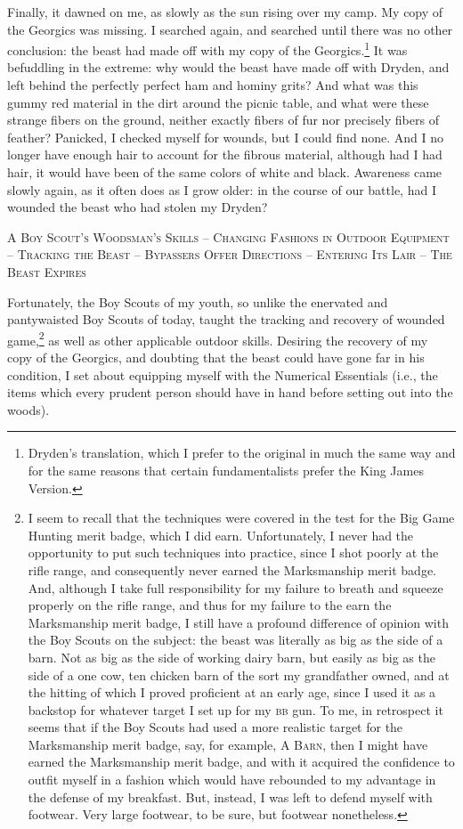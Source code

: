 \par
Finally, it dawned on me, as slowly as the sun rising over my camp.  My copy of the Georgics was missing.  I searched again, and searched until there was no other conclusion: the beast had made off with my copy of the Georgics.\footnote{Dryden's translation, which I prefer to the original in much the same way and for the same reasons that certain fundamentalists prefer the King James Version.}  It was befuddling in the extreme: why would the beast have made off with Dryden, and left behind the perfectly perfect ham and hominy grits?  And what was this gummy red material in the dirt around the picnic table, and what were these strange fibers on the ground, neither exactly fibers of fur nor precisely fibers of feather?  Panicked, I checked myself for wounds, but I could find none.  And I no longer have enough hair to account for the fibrous material, although had I had hair, it would have been of the same colors of white and black.  Awareness came slowly again, as it often does as I grow older: in the course of our battle, had I wounded the beast who had stolen my Dryden?
\par
\begin{center}
\textsc{A Boy Scout's Woodsman's Skills – Changing Fashions in Outdoor Equipment – Tracking the Beast – Bypassers Offer Directions – Entering Its Lair – The Beast Expires}
\end{center}
\par
Fortunately, the Boy Scouts of my youth, so unlike the enervated and pantywaisted Boy Scouts of today, taught the tracking and recovery of wounded game,\footnote{I seem to recall that the techniques were covered in the test for the Big Game Hunting merit badge, which I did earn.  Unfortunately, I never had the opportunity to put such techniques into practice, since I shot poorly at the rifle range, and consequently never earned the Marksmanship merit badge.  And, although I take full responsibility for my failure to breath and squeeze properly on the rifle range, and thus for my failure to the earn the Marksmanship merit badge, I still have a profound difference of opinion with the Boy Scouts on the subject: the beast was literally as big as the side of a barn.  Not as big as the side of working dairy barn, but easily as big as the side of a one cow, ten chicken barn of the sort my grandfather owned, and at the hitting of which I proved proficient at an early age, since I used it as a backstop for whatever target I set up for my \textsc{bb} gun.  To me, in retrospect it seems that if the Boy Scouts had used a more realistic target for the Marksmanship merit badge, say, for example, \textsc{A Barn}, then I might have earned the Marksmanship merit badge, and with it acquired the confidence to outfit myself in a fashion which would have rebounded to my advantage in the defense of my breakfast.  But, instead, I was left to defend myself with footwear.  Very large footwear, to be sure, but footwear nonetheless.} as well as other applicable outdoor skills.  Desiring the recovery of my copy of the Georgics, and doubting that the beast could have gone far in his condition, I set about equipping myself with the Numerical Essentials (i.e., the items which every prudent person should have in hand before setting out into the woods).
